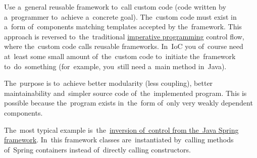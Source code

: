 \label{inversionofcontrol}
Use a~general reusable framework to~call custom code (code written by a~programmer to~achieve a~concrete goal).
The~custom code must exist in a~form of~components matching templates accepted by the~framework.
This approach is reversed to~the~traditional \hyperref[imperativeprogramming]{imperative programming} control flow, where the~custom code calls reusable frameworks.
In~IoC you of~course need at~least some small amount of~the~custom code to~initiate the~framework to~do~something (for~example, you~still need a~main method in~Java).

The~purpose is to~achieve better modularity (less coupling), better maintainability and~simpler source code of~the~implemented program.
This is possible because the~program exists in~the~form of~only very weakly dependent components.

The~most typical example is~the~\hyperref[springinversionofcontrol]{inversion of~control from the~Java Spring framework}.
In~this framework classes are~instantiated by~calling methods of~Spring containers instead of~directly calling constructors.
